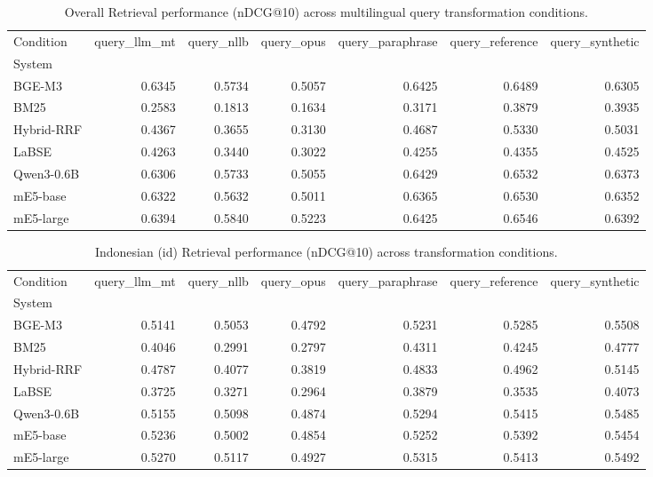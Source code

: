 \begin{table}
\caption{Overall Retrieval performance (nDCG@10) across multilingual query transformation conditions.}
\label{tab:retrieval_performance_overall}
\begin{tabular}{lrrrrrr}
\toprule
Condition & query_llm_mt & query_nllb & query_opus & query_paraphrase & query_reference & query_synthetic \\
System &  &  &  &  &  &  \\
\midrule
BGE-M3 & 0.6345 & 0.5734 & 0.5057 & 0.6425 & 0.6489 & 0.6305 \\
BM25 & 0.2583 & 0.1813 & 0.1634 & 0.3171 & 0.3879 & 0.3935 \\
Hybrid-RRF & 0.4367 & 0.3655 & 0.3130 & 0.4687 & 0.5330 & 0.5031 \\
LaBSE & 0.4263 & 0.3440 & 0.3022 & 0.4255 & 0.4355 & 0.4525 \\
Qwen3-0.6B & 0.6306 & 0.5733 & 0.5055 & 0.6429 & 0.6532 & 0.6373 \\
mE5-base & 0.6322 & 0.5632 & 0.5011 & 0.6365 & 0.6530 & 0.6352 \\
mE5-large & 0.6394 & 0.5840 & 0.5223 & 0.6425 & 0.6546 & 0.6392 \\
\bottomrule
\end{tabular}
\end{table}


\begin{table}
\caption{Indonesian (id) Retrieval performance (nDCG@10) across transformation conditions.}
\label{tab:retrieval_performance_id}
\begin{tabular}{lrrrrrr}
\toprule
Condition & query_llm_mt & query_nllb & query_opus & query_paraphrase & query_reference & query_synthetic \\
System &  &  &  &  &  &  \\
\midrule
BGE-M3 & 0.5141 & 0.5053 & 0.4792 & 0.5231 & 0.5285 & 0.5508 \\
BM25 & 0.4046 & 0.2991 & 0.2797 & 0.4311 & 0.4245 & 0.4777 \\
Hybrid-RRF & 0.4787 & 0.4077 & 0.3819 & 0.4833 & 0.4962 & 0.5145 \\
LaBSE & 0.3725 & 0.3271 & 0.2964 & 0.3879 & 0.3535 & 0.4073 \\
Qwen3-0.6B & 0.5155 & 0.5098 & 0.4874 & 0.5294 & 0.5415 & 0.5485 \\
mE5-base & 0.5236 & 0.5002 & 0.4854 & 0.5252 & 0.5392 & 0.5454 \\
mE5-large & 0.5270 & 0.5117 & 0.4927 & 0.5315 & 0.5413 & 0.5492 \\
\bottomrule
\end{tabular}
\end{table}


